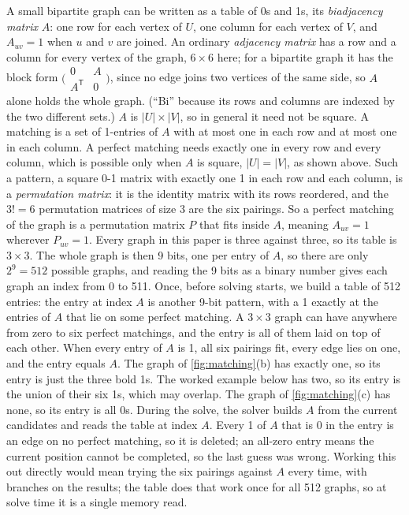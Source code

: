 A small bipartite graph can be written as a table of 0s and 1s, its \emph{biadjacency matrix} $A$: one row for each
vertex of $U$, one column for each vertex of $V$, and $A_{uv}=1$ when $u$ and $v$ are joined. An ordinary
\emph{adjacency matrix} has a row and a column for every vertex of the graph, $6\times 6$ here; for a bipartite graph
it has the block form $\bigl(\begin{smallmatrix} 0 & A \\ A^{\mathsf T} & 0 \end{smallmatrix}\bigr)$, since no edge
joins two vertices of the same side, so $A$ alone holds the whole graph. (``Bi'' because its rows and columns are
indexed by the two different sets.) $A$ is $|U|\times|V|$, so in general it need not be square. A matching is a set of
1-entries of $A$ with at most one in each row and at most one in each column. A perfect matching needs exactly one in
every row and every column, which is possible only when $A$ is square, $|U|=|V|$, as shown above. Such a pattern, a
square 0-1 matrix with exactly one 1 in each row and each column, is a \emph{permutation matrix}: it is the identity
matrix with its rows reordered, and the $3!=6$ permutation matrices of size 3 are the six pairings. So a perfect
matching of the graph is a permutation matrix $P$ that fits inside $A$, meaning $A_{uv}=1$ wherever $P_{uv}=1$. Every
graph in this paper is three against three, so its table is $3\times 3$. The whole graph is then 9 bits, one per entry of $A$, so there
are only $2^9=512$ possible graphs, and reading the 9 bits as a binary number gives each graph an index from 0 to 511.
Once, before solving starts, we build a table of 512 entries: the entry at index $A$ is another 9-bit pattern, with a
1 exactly at the entries of $A$ that lie on some perfect matching. A $3\times 3$ graph can have anywhere from zero to
six perfect matchings, and the entry is all of them laid on top of each other. When every entry of $A$ is 1, all six
pairings fit, every edge lies on one, and the entry equals $A$. The graph of \cref{fig:matching}(b) has exactly one, so
its entry is just the three bold 1s. The worked example below has two, so its entry is the union of their six 1s,
which may overlap. The graph of \cref{fig:matching}(c) has none, so its entry is all 0s. During the solve, the solver builds $A$ from
the current candidates and reads the table at index $A$. Every 1 of $A$ that is 0 in the entry is an edge on no
perfect matching, so it is deleted; an all-zero entry means the current position cannot be completed, so the last
guess was wrong. Working this out directly would mean trying the six pairings against $A$ every time, with branches
on the results; the table does that work once for all 512 graphs, so at solve time it is a single memory read.

